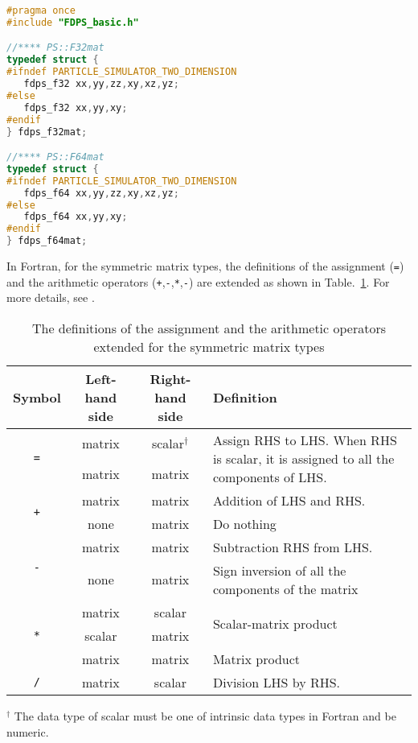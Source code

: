 \begin{lstlisting}[language=C,caption=Symmetric Matrix types (C), label=listing:symmetric_matrix_types_in_C]
#pragma once
#include "FDPS_basic.h"

//**** PS::F32mat
typedef struct {
#ifndef PARTICLE_SIMULATOR_TWO_DIMENSION
   fdps_f32 xx,yy,zz,xy,xz,yz;
#else
   fdps_f32 xx,yy,xy;
#endif
} fdps_f32mat;

//**** PS::F64mat
typedef struct {
#ifndef PARTICLE_SIMULATOR_TWO_DIMENSION
   fdps_f64 xx,yy,zz,xy,xz,yz;
#else
   fdps_f64 xx,yy,xy;
#endif
} fdps_f64mat;
\end{lstlisting}

In Fortran, for the symmetric matrix types, the definitions of the assignment (\texttt{=}) and the arithmetic operators (\texttt{+},\texttt{-},\texttt{*},\texttt{-}) are extended as shown in Table.~\ref{tbl:op_ext:fdps_matrix}. For more details, see .

\begin{table}[H]
\begin{tabularx}{\linewidth}{|c|c|c|X|}
\toprule
\rowcolor{Snow2}
Symbol & Left-hand side & Right-hand side & Definition \\
\midrule
\multirow{2}{*}{\texttt{=}}& matrix & scalar$^{\dagger}$ & \multirow{2}{\hsize}{\footnotesize Assign RHS to LHS. When RHS is scalar, it is assigned to all the components of LHS.} \\
\cmidrule(r){2-3}
& matrix & matrix & \\
\midrule
\multirow{2}{*}{\texttt{+}} & matrix & matrix & Addition of LHS and RHS. \\
\cmidrule(r){2-4}
& none & matrix & Do nothing \\
\midrule
\multirow{2}{*}{\texttt{-}} & matrix & matrix & Subtraction RHS from LHS. \\
\cmidrule(r){2-4}
& none & matrix & {\footnotesize Sign inversion of all the components of the matrix} \\
\midrule
\multirow{3}{*}{\texttt{*}} & matrix & scalar & \multirow{2}{*}{Scalar-matrix product} \\
\cmidrule(r){2-3}
 & scalar & matrix &  \\
\cmidrule(r){2-4}
 & matrix & matrix & Matrix product \\
\midrule
\texttt{/} & matrix & scalar & Division LHS by RHS. \\
\bottomrule
\end{tabularx}
\begin{flushleft}
$^{\dagger}$ The data type of scalar must be one of intrinsic data types in Fortran and be numeric.
\end{flushleft}
\caption{The definitions of the assignment and the arithmetic operators extended for the symmetric matrix types}
\label{tbl:op_ext:fdps_matrix}
\end{table}



